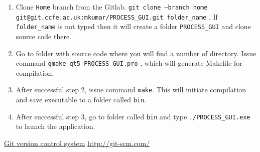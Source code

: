 \documentclass[11pt,a4paper]{report}
\begin{document}
\begin{enumerate}

\item    Clone \texttt{Home} branch from the Gitlab.   \texttt{git clone --branch home git@git.ccfe.ac.uk:mkumar/PROCESS\_GUI.git folder\_name} . If \texttt{folder\_name} is not typed then it will create a folder \texttt{PROCESS\_GUI} and clone source code there.

\item    Go to folder with source code where you will find a number of directory. Issue command   \texttt{qmake-qt5 PROCESS\_GUI.pro}  , which will generate Makefile for compilation.

\item After successful step 2, issue command \texttt{make}. This will initiate compilation and save executable to a folder called \texttt{bin}.

\item    After successful step 3, go to folder called \texttt{bin} and type  \texttt{./PROCESS\_GUI.exe} to launch the application.

\end{enumerate}


\begin{thebibliography}{99}
\raggedright

\href{http://git-scm.com/}{Git version control system}
\url{http://git-scm.com/}


\end{thebibliography}
\end{document}
